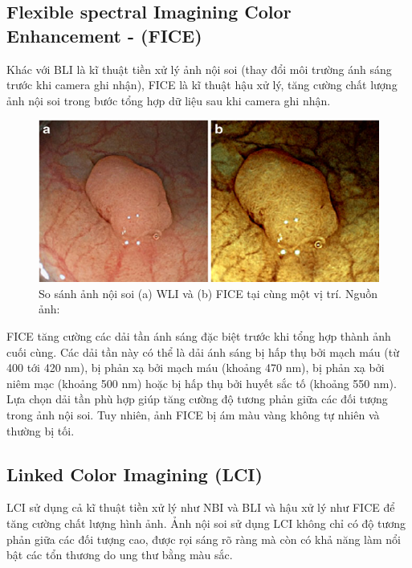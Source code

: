 \documentclass[12pt]{extreport}
\begin{document}
\subsection{Flexible spectral Imagining Color Enhancement - (FICE)}

Khác với BLI là kĩ thuật tiền xử lý ảnh nội soi (thay đổi môi trường ánh sáng trước khi camera ghi nhận), FICE là kĩ thuật hậu xử lý, tăng cường chất lượng ảnh nội soi trong bước tổng hợp dữ liệu sau khi camera ghi nhận.

\begin{figure}[H]
    \centering
    \includegraphics[width=0.9\linewidth]{figure20.png}
    \caption{So sánh ảnh nội soi (a) WLI và (b) FICE tại cùng một vị trí. Nguồn ảnh: \cite{s0038401113808}}
\end{figure}

FICE tăng cường các dải tần ánh sáng đặc biệt trước khi tổng hợp thành ảnh cuối cùng. Các dải tần này có thể là dải ánh sáng bị hấp thụ bởi mạch máu (từ 400 tới 420 nm), bị phản xạ bởi mạch máu (khoảng 470 nm), bị phản xạ bởi niêm mạc (khoảng 500 nm) hoặc bị hấp thụ bởi huyết sắc tố (khoảng 550 nm). Lựa chọn dải tần phù hợp giúp tăng cường độ tương phản giữa các đối tượng trong ảnh nội soi. Tuy nhiên, ảnh FICE bị ám màu vàng không tự nhiên và thường bị tối.

\subsection{Linked Color Imagining (LCI)}
\label{lci}

LCI sử dụng cả kĩ thuật tiền xử lý như NBI và BLI và hậu xử lý như FICE để tăng cường chất lượng hình ảnh. Ảnh nội soi sử dụng LCI không chỉ có độ tương phản giữa các đối tượng cao, được rọi sáng rõ ràng mà còn có khả năng làm nổi bật các tổn thương do ung thư bằng màu sắc.
\end{document}

